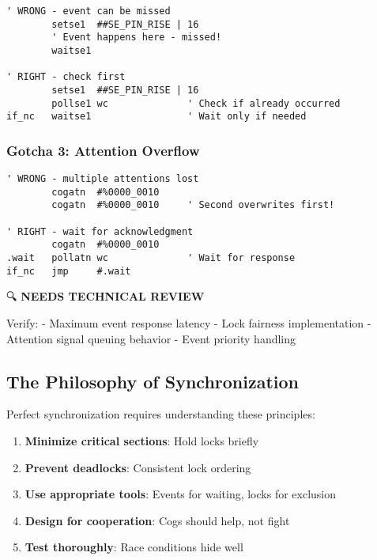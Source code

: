 \documentclass[11pt]{book}
\providecommand{\tightlist}{%
  \setlength{\itemsep}{0pt}\setlength{\parskip}{0pt}}
\begin{document}
\begin{lstlisting}
' WRONG - event can be missed
        setse1  ##SE_PIN_RISE | 16
        ' Event happens here - missed!
        waitse1
        
' RIGHT - check first
        setse1  ##SE_PIN_RISE | 16
        pollse1 wc              ' Check if already occurred
if_nc   waitse1                 ' Wait only if needed
\end{lstlisting}

\hypertarget{gotcha-3-attention-overflow}{%
\subsubsection{Gotcha 3: Attention
Overflow}\label{gotcha-3-attention-overflow}}

\begin{lstlisting}
' WRONG - multiple attentions lost
        cogatn  #%0000_0010
        cogatn  #%0000_0010     ' Second overwrites first!
        
' RIGHT - wait for acknowledgment
        cogatn  #%0000_0010
.wait   pollatn wc              ' Wait for response
if_nc   jmp     #.wait
\end{lstlisting}

\begin{review}
🔍 \textbf{NEEDS TECHNICAL REVIEW}

Verify:
- Maximum event response latency
- Lock fairness implementation
- Attention signal queuing behavior
- Event priority handling
\end{review}

\hypertarget{the-philosophy-of-synchronization}{%
\subsection{The Philosophy of
Synchronization}\label{the-philosophy-of-synchronization}}

Perfect synchronization requires understanding these principles:

\begin{enumerate}
\def\labelenumi{\arabic{enumi}.}
\tightlist
\item
  \textbf{Minimize critical sections}: Hold locks briefly
\item
  \textbf{Prevent deadlocks}: Consistent lock ordering
\item
  \textbf{Use appropriate tools}: Events for waiting, locks for
  exclusion
\item
  \textbf{Design for cooperation}: Cogs should help, not fight
\item
  \textbf{Test thoroughly}: Race conditions hide well
\end{enumerate}
\end{document}
